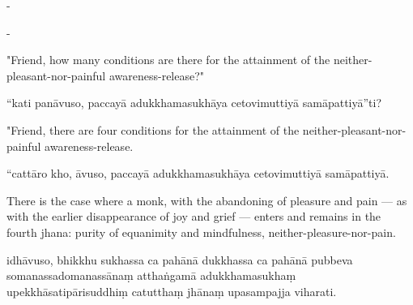 \begin{samepage}
\begin{leftcolumn*}
-
\end{leftcolumn*}

\begin{rightcolumn}
-
\end{rightcolumn}
\end{samepage}

\begin{samepage}
\begin{leftcolumn*}
"Friend, how many conditions are there for the attainment of the neither-pleasant-nor-painful awareness-release?"
\end{leftcolumn*}

\begin{rightcolumn}
“kati panāvuso, paccayā adukkhamasukhāya cetovimuttiyā samāpattiyā”ti?
\end{rightcolumn}
\end{samepage}

\begin{samepage}
\begin{leftcolumn*}
"Friend, there are four conditions for the attainment of the neither-pleasant-nor-painful awareness-release.
\end{leftcolumn*}

\begin{rightcolumn}
“cattāro kho, āvuso, paccayā adukkhamasukhāya cetovimuttiyā samāpattiyā.
\end{rightcolumn}
\end{samepage}

\begin{samepage}
\begin{leftcolumn*}
There is the case where a monk, with the abandoning of pleasure and pain — as with the earlier disappearance of joy and grief — enters and remains in the fourth jhana: purity of equanimity and mindfulness, neither-pleasure-nor-pain.
\end{leftcolumn*}

\begin{rightcolumn}
idhāvuso, bhikkhu sukhassa ca pahānā dukkhassa ca pahānā pubbeva somanassadomanassānaṃ atthaṅgamā adukkhamasukhaṃ upekkhāsatipārisuddhiṃ catutthaṃ jhānaṃ upasampajja viharati.
\end{rightcolumn}
\end{samepage}

